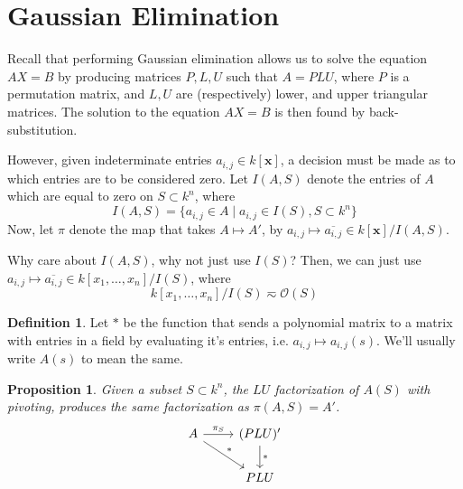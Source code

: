 \documentclass{amsart}
\newtheorem{proposition}[theorem]{Proposition}
\theoremstyle{definition}
\newtheorem{definition}[theorem]{Definition}
\theoremstyle{remark}
\numberwithin{equation}{section}
\begin{document}

\section{Gaussian Elimination}

Recall that performing Gaussian elimination allows us to solve the equation $AX = B$ by producing matrices $P, L, U$ such that $A = PLU$, where $P$ is a permutation matrix, and $L, U$ are (respectively) lower, and upper triangular matrices. The solution to the equation $AX = B$ is then found by back-substitution.

However, given indeterminate entries $a_{i,j} \in k[\mathbf{x}]$, a decision must be made as to which entries are to be considered zero. Let $I(A, S)$ denote the entries of $A$ which are equal to zero on $S \subset k^n$, where
\begin{equation*}
  I(A, S) = \{ a_{i,j} \in A \mid a_{i,j} \in I(S), S \subset k^n \}
\end{equation*}
Now, let $\pi$ denote the map that takes $A \mapsto A'$, by $a_{i,j} \mapsto \overline{a_{i,j}} \in k[\mathbf{x}]/I(A, S)$.
\begin{aroundtodo}[caption={}]
  Why care about $I(A, S)$, why not just use $I(S)$? Then, we can just use $a_{i,j} \mapsto \overline{a_{i,j}} \in k[x_1, \ldots, x_n]/I(S)$, where
  \begin{equation*}
    k[x_1, \ldots, x_n]/I(S) \eqsim \mathcal{O}(S)
  \end{equation*}
\end{aroundtodo}

\begin{definition}
  Let $*$ be the function that sends a polynomial matrix to a matrix with entries in a field by evaluating it's entries, i.e. $a_{i,j} \mapsto a_{i,j}(s)$. We'll usually write $A(s)$ to mean the same.
\end{definition}

\begin{proposition}
  Given a subset $S \subset k^n$, the $LU$ factorization of $A(S)$ with pivoting, produces the same factorization as $\pi(A, S) = A'$.
  \begin{equation*}
    \begin{tikzcd}
      A \arrow[dr]{}{*} \arrow[r]{}{\pi_S} & \arrow[d]{}{*} (PLU)'\\
      & PLU
    \end{tikzcd}
  \end{equation*}
\end{proposition}
\end{document}
